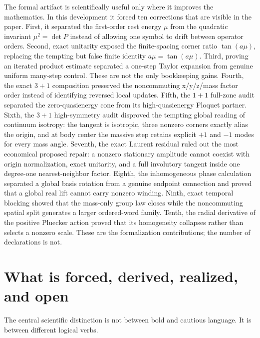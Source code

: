 \documentclass[11pt]{article}
\begin{document}
The formal artifact is scientifically useful only where it improves the
mathematics.  In this development it forced ten corrections that are visible
in the paper.  First, it separated the first-order rest energy $\mu$ from the
quadratic invariant $\mu^2=\det P$ instead of allowing one symbol to drift
between operator orders.  Second, exact unitarity exposed the finite-spacing
corner ratio $\tan(a\mu)$, replacing the tempting but false finite identity
$a\mu=\tan(a\mu)$.  Third, proving an iterated product estimate separated a
one-step Taylor expansion from genuine uniform many-step control.  These are
not the only bookkeeping gains.  Fourth, the exact $3+1$ composition preserved
the noncommuting x/y/z/mass factor order instead of identifying reversed local
 updates.  Fifth, the $1+1$ full-zone audit separated the zero-quasienergy cone
 from its high-quasienergy Floquet partner.  Sixth, the $3+1$ high-symmetry audit
 disproved the tempting global reading of continuum isotropy: the tangent is
 isotropic, three nonzero corners exactly alias the origin, and at body center
 the massive step retains explicit $+1$ and $-1$ modes for every mass angle.
 Seventh, the exact Laurent residual ruled out the most economical proposed
 repair: a nonzero stationary amplitude cannot coexist with origin
 normalization, exact unitarity, and a full involutory tangent inside one
 degree-one nearest-neighbor factor.
 Eighth, the inhomogeneous phase calculation separated a global basis rotation
 from a genuine endpoint connection and proved that a global real lift cannot
 carry nonzero winding.  Ninth, exact temporal blocking showed that the
 mass-only group law closes while the noncommuting spatial split generates a
 larger ordered-word family.  Tenth, the radial derivative of the positive
 Pluecker action proved that its homogeneity collapses rather than selects a
 nonzero scale.
 These are the formalization contributions; the number of declarations is not.

\section{What is forced, derived, realized, and open}

The central scientific distinction is not between bold and cautious language.
It is between different logical verbs.
\end{document}
